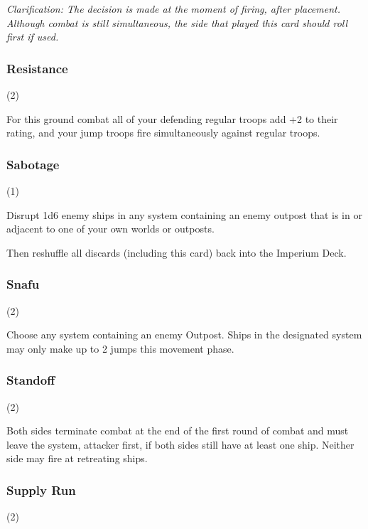 \documentclass[a4paper,11pt,twocolumn]{article}
\begin{document}
\textit{Clarification: The decision is made at the moment of firing, after placement. Although combat is still simultaneous, the side that played this card should roll first if used.}

\subsubsection{Resistance} (2)


For this ground combat all of your defending regular troops add +2 to their rating, and your jump troops fire simultaneously against regular troops.

\subsubsection{Sabotage} (1)


Disrupt 1d6 enemy ships in any system containing an enemy outpost that is in or adjacent to one of your own worlds or outposts.

Then reshuffle all discards (including this card) back into the Imperium Deck.

\subsubsection{Snafu} (2)


Choose any system containing an enemy Outpost. Ships in the designated system may only make up to 2 jumps this movement phase.

\subsubsection{Standoff} (2)


Both sides terminate combat at the end of the first round of combat and must leave the system, attacker first, if both sides still have at least one ship. Neither side may fire at retreating ships.

\subsubsection{Supply Run} (2)

\end{document}
